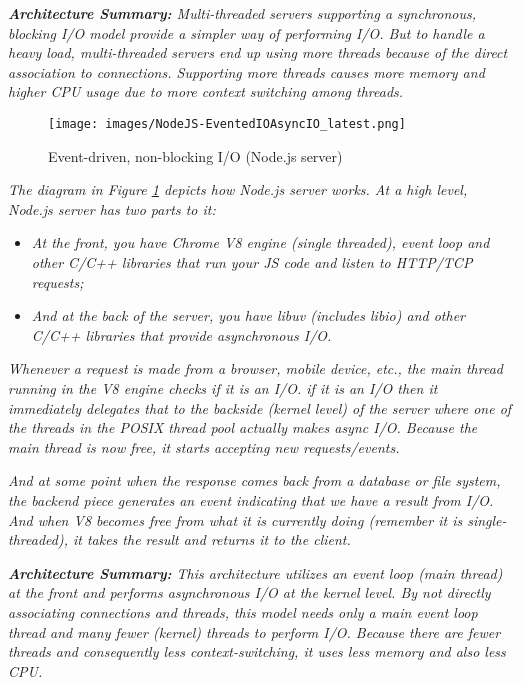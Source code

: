\textit{\textbf{Architecture Summary:} Multi-threaded servers supporting a synchronous, blocking I/O model provide a simpler way of performing I/O. But to handle a heavy load, multi-threaded servers end up using more threads because of the direct association to connections. Supporting more threads causes more memory and higher CPU usage due to more context switching among threads.}

\begin{figure}[H]
\centering %
\texttt{[image: images/NodeJS-EventedIOAsyncIO\_latest.png]}
\caption{Event-driven, non-blocking I/O (Node.js server)}
\label{fig:nodejsServer}
\end{figure}

\textit{The diagram in Figure \ref{fig:nodejsServer} depicts how Node.js server works. At a high level, Node.js server has two parts to it:}
\begin{itemize}
\item \textit{At the front, you have Chrome V8 engine (single threaded), event loop and other C/C++ libraries that run your JS code and listen to HTTP/TCP requests;}
\item \textit{And at the back of the server, you have libuv (includes libio) and other C/C++ libraries that provide asynchronous I/O.}
\end{itemize}

\textit{Whenever a request is made from a browser, mobile device, etc., the main thread running in the V8 engine checks if it is an I/O. if it is an I/O then it immediately delegates that to the backside (kernel level) of the server where one of the threads in the POSIX thread pool actually makes async I/O. Because the main thread is now free, it starts accepting new requests/events.}

\textit{And at some point when the response comes back from a database or file system, the backend piece generates an event indicating that we have a result from I/O. And when V8 becomes free from what it is currently doing (remember it is single-threaded), it takes the result and returns it to the client.}

\textit{\textbf{Architecture Summary:} This architecture utilizes an event loop (main thread) at the front and performs asynchronous I/O at the kernel level. By not directly associating connections and threads, this model needs only a main event loop thread and many fewer (kernel) threads to perform I/O. Because there are fewer threads and consequently less context-switching, it uses less memory and also less CPU.}

